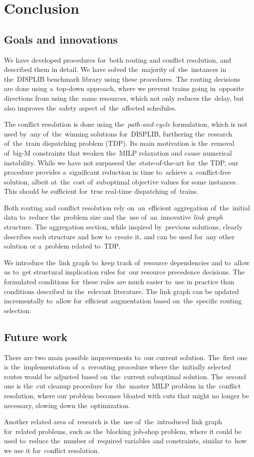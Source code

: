 \chapter{Conclusion}
\label{chap:concl}

\section{Goals and innovations}
We have developed procedures for~both routing and conflict resolution, and described them in detail. We have solved the~majority of~the~instances in the~DISPLIB benchmark library using these procedures. The routing decisions are done using a~top-down approach, where we prevent trains going in~opposite directions from using the~same resources, which not only reduces the~delay, but also improves the~safety aspect of~the~affected schedules.

The conflict resolution is done using the~\emph{path-and-cycle} formulation, which is not used by~any of~the~winning solutions for~DISPLIB, furthering the~research of~the~train dispatching problem (TDP). Its main motivation is the~removal of~big-M constraints that weaken the~MILP relaxation and cause numerical instability. While we have not surpassed the~state-of-the-art for~the TDP, our procedure provides a~significant reduction in time to~achieve a~conflict-free solution, albeit at~the~cost of~suboptimal objective values for some instances. This should be sufficient for~true real-time dispatching of~trains.

Both routing and conflict resolution rely on~an~efficient aggregation of~the~initial data to~reduce the~problem size and the~use of~an~innovative \emph{link graph} structure. The aggregation section, while inspired by~previous solutions, clearly describes each structure and how to~create it, and can be used for~any other solution or a~problem related to~TDP.

We introduce the~link graph to~keep track of~resource dependencies and to~allow us to~get structural implication rules for~our resource precedence decisions. The formulated conditions for~these rules are much easier to~use in practice than conditions described in the~relevant literature. The link graph can be updated incrementally to~allow for~efficient augmentation based on~the~specific routing selection.

\section{Future work}
There are two main possible improvements to~our current solution. The~first one is the~implementation of~a~rerouting procedure where the~initially selected routes would be adjusted based on~the~current suboptimal solution. The~second one is the~cut cleanup procedure for~the~master MILP problem in the~conflict resolution, where our problem becomes bloated with cuts that might no longer be necessary, slowing down the~optimization.

Another related area of~research is the~use of~the~introduced link graph for~related problems, such as the~blocking job-shop problem, where it could be used to~reduce the~number of~required variables and constraints, similar to~how we use it for~conflict resolution.